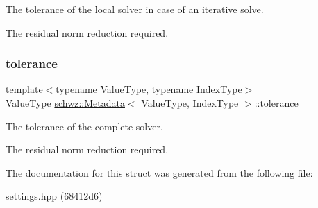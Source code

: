 The tolerance of the local solver in case of an iterative solve. 

The residual norm reduction required. \mbox{\label{structschwz_1_1Metadata_a366db94e2a75dbdd82616e0d0b33bb86}} 
\subsubsection{\texorpdfstring{tolerance}{tolerance}}
{\footnotesize\ttfamily template$<$typename Value\+Type, typename Index\+Type$>$ \\
Value\+Type \hyperlink{structschwz_1_1Metadata}{schwz\+::\+Metadata}$<$ Value\+Type, Index\+Type $>$\+::tolerance}



The tolerance of the complete solver. 

The residual norm reduction required. 

The documentation for this struct was generated from the following file\+:\begin{DoxyCompactItemize}
\item 
settings.\+hpp (68412d6)\end{DoxyCompactItemize}
